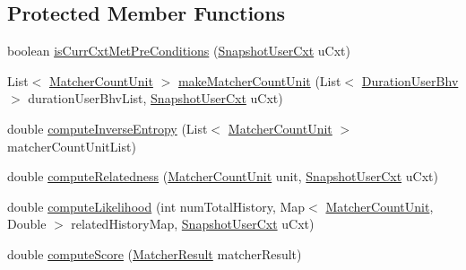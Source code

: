 \subsection*{\-Protected \-Member \-Functions}
\begin{DoxyCompactItemize}
\item 
boolean \hyperlink{classlab_1_1davidahn_1_1appshuttle_1_1predict_1_1matcher_1_1position_1_1_move_position_matcher_ae50d763e03c0c4ecd322e5121a04c425}{is\-Curr\-Cxt\-Met\-Pre\-Conditions} (\hyperlink{classlab_1_1davidahn_1_1appshuttle_1_1collect_1_1_snapshot_user_cxt}{\-Snapshot\-User\-Cxt} u\-Cxt)
\item 
\-List$<$ \hyperlink{classlab_1_1davidahn_1_1appshuttle_1_1predict_1_1matcher_1_1_matcher_count_unit}{\-Matcher\-Count\-Unit} $>$ \hyperlink{classlab_1_1davidahn_1_1appshuttle_1_1predict_1_1matcher_1_1position_1_1_move_position_matcher_adba38518fe3f3946969f1428a4f0569f}{make\-Matcher\-Count\-Unit} (\-List$<$ \hyperlink{classlab_1_1davidahn_1_1appshuttle_1_1collect_1_1bhv_1_1_duration_user_bhv}{\-Duration\-User\-Bhv} $>$ duration\-User\-Bhv\-List, \hyperlink{classlab_1_1davidahn_1_1appshuttle_1_1collect_1_1_snapshot_user_cxt}{\-Snapshot\-User\-Cxt} u\-Cxt)
\item 
double \hyperlink{classlab_1_1davidahn_1_1appshuttle_1_1predict_1_1matcher_1_1position_1_1_move_position_matcher_a00949f54a273a12b8d71979f77bb5ce6}{compute\-Inverse\-Entropy} (\-List$<$ \hyperlink{classlab_1_1davidahn_1_1appshuttle_1_1predict_1_1matcher_1_1_matcher_count_unit}{\-Matcher\-Count\-Unit} $>$ matcher\-Count\-Unit\-List)
\item 
double \hyperlink{classlab_1_1davidahn_1_1appshuttle_1_1predict_1_1matcher_1_1position_1_1_move_position_matcher_a4fbd9deb43a6ef1b133d121631466935}{compute\-Relatedness} (\hyperlink{classlab_1_1davidahn_1_1appshuttle_1_1predict_1_1matcher_1_1_matcher_count_unit}{\-Matcher\-Count\-Unit} unit, \hyperlink{classlab_1_1davidahn_1_1appshuttle_1_1collect_1_1_snapshot_user_cxt}{\-Snapshot\-User\-Cxt} u\-Cxt)
\item 
double \hyperlink{classlab_1_1davidahn_1_1appshuttle_1_1predict_1_1matcher_1_1position_1_1_move_position_matcher_a8a6ed1575c16fb4fdea403d0928c9ce2}{compute\-Likelihood} (int num\-Total\-History, \-Map$<$ \hyperlink{classlab_1_1davidahn_1_1appshuttle_1_1predict_1_1matcher_1_1_matcher_count_unit}{\-Matcher\-Count\-Unit}, \-Double $>$ related\-History\-Map, \hyperlink{classlab_1_1davidahn_1_1appshuttle_1_1collect_1_1_snapshot_user_cxt}{\-Snapshot\-User\-Cxt} u\-Cxt)
\item 
double \hyperlink{classlab_1_1davidahn_1_1appshuttle_1_1predict_1_1matcher_1_1position_1_1_move_position_matcher_a9b963792f61c3d8a0226f02575523a7c}{compute\-Score} (\hyperlink{classlab_1_1davidahn_1_1appshuttle_1_1predict_1_1matcher_1_1_matcher_result}{\-Matcher\-Result} matcher\-Result)
\end{DoxyCompactItemize}


